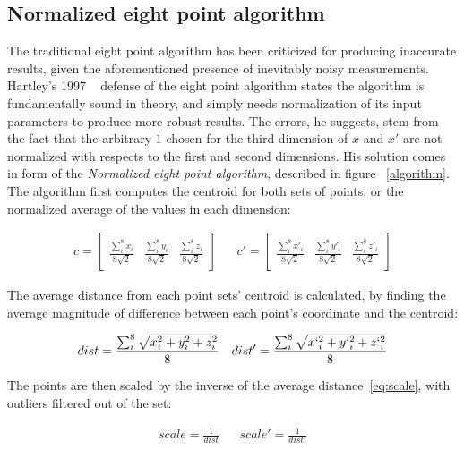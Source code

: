 \documentclass[Conference]{IEEEtran}
\begin{document}
\subsection{Normalized eight point algorithm}

The traditional eight point algorithm has been criticized for producing inaccurate results, given the aforementioned presence of inevitably noisy measurements.  Hartley’s 1997 ~\cite{Hartley:1997:DEA:262631.262634} defense of the eight point algorithm states the algorithm is fundamentally sound in theory, and simply needs normalization of its input parameters to produce more robust results. The errors, he suggests, stem from the fact that the arbitrary $1$ chosen for the third dimension of $x$ and $x'$ are not normalized with respects to the first and second dimensions.
His solution comes in form of the \textit{Normalized eight point algorithm}, described in figure ~\ref{algorithm}. The algorithm first computes the centroid for both sets of points, or the normalized average of the values in each dimension:

\begin{align}\label{eq:centroid}
    c =\begin{bmatrix}
        \frac{\sum_{i}^{8}x_i}{8\sqrt{2}} & \frac{\sum_{i}^{8}y_i}{8\sqrt{2}} & \frac{\sum_{i}^{8}z_i}{8\sqrt{2}}
    \end{bmatrix}
&&
    c' =\begin{bmatrix}
        \frac{\sum_{i}^{8}x'_i}{8\sqrt{2}} & \frac{\sum_{i}^{8}y'_i}{8\sqrt{2}} & \frac{\sum_{i}^{8}z'_i}{8\sqrt{2}}
    \end{bmatrix}
\end{align}

The average distance from each point sets' centroid is calculated, by finding the average magnitude of difference between each point's coordinate and the centroid:

\begin{align}\label{eq:avgDistance}
    dist = \frac{
        \sum_{i}^{8}
        \sqrt{x_i^{2}+y_i^{2}+z_i^{2}}
    }{8}
&&
    dist' = \frac{
        \sum_{i}^{8}
        \sqrt{x`_i^{2}+y`_i^{2}+z`_i^{2}}
    }{8}
\end{align}

The points are then scaled by the inverse of the average distance~\ref{eq:scale}, with outliers filtered out of the set:

\begin{align}\label{eq:scale}
    scale = \frac{1}{dist}
&&
    scale' = \frac{1}{dist'}
\end{align}
\end{document}
